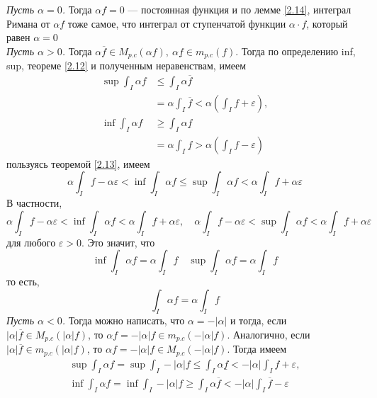 \documentclass[a4paper]{article}
\begin{document}
\begin{enumerate}
    \textit{Пусть $\alpha=0$.} Тогда $\alpha f=0$ — постоянная функция и по лемме \ref{2.14}, интеграл Римана от $\alpha f$ тоже самое, что интеграл от ступенчатой функции $\alpha\cdot f$, который равен $\alpha=0$\\[2mm]
    \textit{Пусть $\alpha>0$.} Тогда $\alpha\overline{f}\in M_{p.c}(\alpha f),\ \alpha\underline{f}\in m_{p.c}(f)$. Тогда по определению inf, sup, теореме \ref{2.12} и полученным неравенствам, имеем
    $$\begin{aligned}
        \sup\int_I\alpha f&\leqslant\int_I\alpha\overline{f}\\
        &=\alpha\int_I\overline{f}<\alpha\left(\int_I f+\varepsilon\right),\\
        \inf\int_I\alpha f&\geqslant\int_I\alpha\underline{f}\\
        &=\alpha\int_I\underline{f}>\alpha\left(\int_I f-\varepsilon\right)
    \end{aligned}$$
    пользуясь теоремой \ref{2.13}, имеем
    \begin{equation*}
        \alpha\int_I f-\alpha\varepsilon<\inf\int_I\alpha f\leqslant\sup\int_I\alpha f<\alpha\int_I f+\alpha\varepsilon
    \end{equation*}
    В частности,
    \begin{equation*}
        \alpha\int_I f-\alpha\varepsilon<\inf\int_I\alpha f<\alpha\int_I f+\alpha\varepsilon,\quad\alpha\int_I f-\alpha\varepsilon<\sup\int_I\alpha f<\alpha\int_I f+\alpha\varepsilon
    \end{equation*}
    для любого $\varepsilon>0$. Это значит, что
    \begin{equation*}
        \inf\int_I\alpha f=\alpha\int_I f\quad\sup\int_I\alpha f=\alpha\int_I f
    \end{equation*}
    то есть,
    \begin{equation*}
        \int_I\alpha f=\alpha\int_I f
    \end{equation*}
    \textit{Пусть $\alpha<0$.} Тогда можно написать, что $\alpha=-|\alpha|$ и тогда, если $|\alpha|\overline{f}\in M_{p.c}(|\alpha|f)$, то $\alpha f=-|\alpha|f\in m_{p.c}(-|\alpha|f)$. Аналогично, если $|\alpha|\overline{f}\in m_{p.c}(|\alpha|f)$, то $\alpha f=-|\alpha|f\in M_{p.c}(-|\alpha|f)$. Тогда имеем
    $$\begin{aligned}
        \sup\int_I\alpha f=\sup\int_I-|\alpha|f\leqslant\int_I\alpha\underline{f}<-|\alpha|\int_I f+\varepsilon,\\
        \inf\int_I\alpha f=\inf\int_I-|\alpha|f\geqslant\int_I\alpha\overline{f}<-|\alpha|\int_I \overline{f}-\varepsilon

\end{aligned}$$
\end{enumerate}
\end{document}
